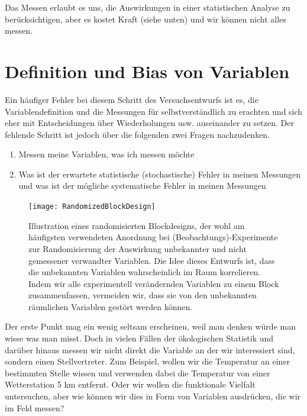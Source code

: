 \documentclass[a4paper,twoside]{tufte-book}\usepackage[]{graphicx}\usepackage[]{color}
\begin{document}
Das Messen erlaubt es uns, die Auswirkungen in einer statistischen Analyse zu berücksichtigen, aber es kostet Kraft (siehe unten) und wir können nicht alles messen.
\section{Definition und Bias von Variablen}

Ein häufiger Fehler bei diesem Schritt des Versuchsentwurfs ist es, die Variablendefinition und die Messungen für selbstverständlich zu erachten und sich eher mit Entscheidungen über Wiederholungen usw. auseinander zu setzen. Der fehlende Schritt ist jedoch über die folgenden zwei Fragen nachzudenken. 

\begin{enumerate}
  \item Messen meine Variablen, was ich messen möchte
  \item Was ist der erwartete statistische (stochastische) Fehler in meinen Messungen und was ist der mögliche systematische Fehler in meinen Messungen
\end{enumerate}

\begin{figure}[]
\begin{center}
\texttt{[image: RandomizedBlockDesign]}
\caption{Illustration eines randomisierten Blockdesigns, der wohl am häufigsten verwendeten Anordnung bei (Beobachtungs)-Experimente zur Randomisierung der Auswirkung unbekannter und nicht gemessener verwandter Variablen. Die Idee dieses Entwurfs ist, dass die unbekannten Variablen wahrscheinlich im Raum korrelieren. Indem wir alle experimentell verändernden Variablen zu einem Block zusammenfassen, vermeiden wir, dass sie von den unbekannten räumlichen Variablen gestört werden können.}
\label{fig: RandomizedBlockDesign}
\end{center}
\end{figure}


Der erste Punkt mag ein wenig seltsam erscheinen, weil man denken würde man wisse was man misst. Doch in vielen Fällen der ökologischen Statistik und darüber hinaus messen wir nicht direkt die Variable an der wir interessiert sind, sondern einen Stellvertreter. Zum Beispiel, wollen wir die Temperatur an einer bestimmten Stelle wissen und verwenden dabei die Temperatur von einer Wetterstation 5 km entfernt. Oder wir wollen die funktionale Vielfalt untersuchen, aber wie können wir dies in Form von Variablen ausdrücken, die wir im Feld messen?
\end{document}
